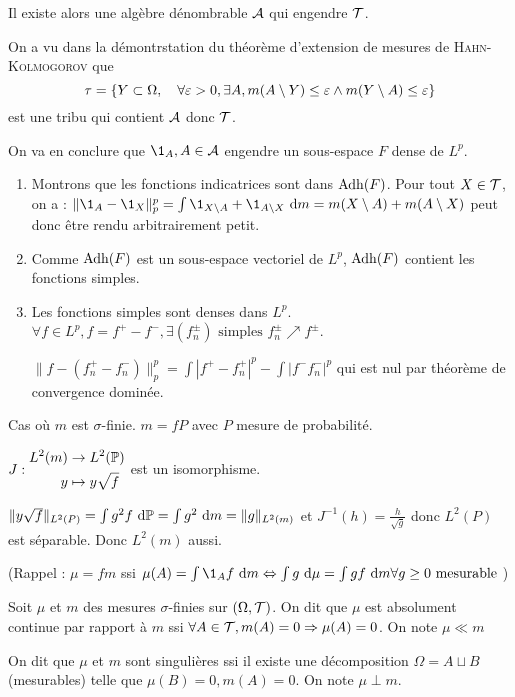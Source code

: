 \documentclass[10pt,a4paper,notitlepage ]{report}
\begin{document}
\begin{demo}
	Il existe alors une algèbre dénombrable $\mathcal A$ qui engendre $\mathcal T$.
	
	On a vu dans la démontrstation du théorème d'extension de mesures de \textsc{Hahn-Kolmogorov} que 
	\[
	\tau = \{Y \subset \Omega,\quad  \forall \varepsilon > 0, \exists A, m(A\setminus Y) \le \varepsilon \wedge m(Y\setminus A) \le \varepsilon \}
	\]
	est une tribu qui contient $\mathcal A$ donc $\mathcal T$.
	
	On va en conclure que $\1_A, A\in\A$ engendre un sous-espace $F$ dense de $L^p$.
	\begin{enumerate}
		\item Montrons que les fonctions indicatrices sont dans $\operatorname{Adh}(F)$. Pour tout $X\in\mathcal T$, on a :
		$\|\1_A - \1_X\|_p^p = \int \1_{X\setminus A} + \1_{A\setminus X} \dd m = m(X\setminus A) + m(A\setminus X)$ peut donc être rendu arbitrairement petit.
		\item Comme $\operatorname{Adh}(F)$ est un sous-espace vectoriel de $L^p$, $\operatorname{Adh}(F)$ contient les fonctions simples.
		\item Les fonctions simples sont denses dans $L^p$. $\forall f \in L^p, f=f^+ - f^-, \exists (f_n^\pm) \text{ simples } f_n^\pm \nearrow f^\pm$.
		
		$\|f-(f_n^+-f_n^-)\|_p^p = \int |f^+-f_n^+|^p - \int |f^- f_n^-|^p$ qui est nul par théorème de convergence dominée.
	\end{enumerate}

	Cas où $m$ est $\sigma$-finie. $m=fP$ avec $P$ mesure de probabilité.
	
	$J : \begin{aligned} L^2(m) &\rightarrow L^2(\mathbb P) \\ y&\mapsto y\sqrt f\end{aligned}$ est un isomorphisme.
	
	$\|y\sqrt f\|_{L^2(P)} = \int g^2 f\ \mathrm d\mathbb P = \int g^2 \ \mathrm d m = \|g\|_{L^2(m)}$ et $J^{-1}(h) = \frac h {\sqrt g}$ donc $L^2(P)$ est séparable. Donc $L^2(m)$ aussi.
	
	(Rappel : $\mu = fm$ ssi $\mu(A) = \int \1_A f \dd m \Leftrightarrow \int g \dd\mu = \int gf\dd m \forall g\ge 0\text{ mesurable }$)
		
\end{demo}

\begin{definition}
	Soit $\mu$ et $m$ des mesures $\sigma$-finies sur $(\Omega,\mathcal T)$.
	On dit que $\mu$ est absolument continue par rapport à $m$ ssi $\forall A\in\mathcal T, m(A)=0 \Rightarrow \mu(A) = 0$. On note $\mu \ll m$
	
	On dit que $\mu$ et $m$ sont singulières ssi il existe une décomposition $\Omega = A \sqcup B$ (mesurables) telle que $\mu(B) = 0, m(A)=0$. On note $\mu \perp m$.
\end{definition}
\end{document}
